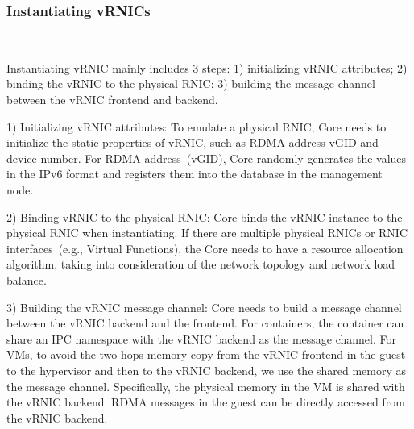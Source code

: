 \subsubsection{\textbf{Instantiating vRNICs}}
\
\noindent


Instantiating vRNIC mainly includes 3 steps: 1) initializing vRNIC attributes; 2) binding the vRNIC to the physical RNIC; 3) building the message channel between the vRNIC frontend and backend.


1) Initializing vRNIC attributes: To emulate a physical RNIC, \sys Core needs to initialize the static properties of vRNIC, such as RDMA address vGID and device number. For RDMA address~(vGID), \sys Core randomly generates the values in the IPv6 format and registers them into the database in the management node.


2) Binding vRNIC to the physical RNIC: \sys Core binds the vRNIC instance to the physical RNIC when instantiating. If there are multiple physical RNICs or RNIC interfaces~(e.g., Virtual Functions), the \sys Core needs to have a resource allocation algorithm, taking into consideration of the network topology and network load balance.


3) Building the vRNIC message channel: \sys Core needs to build a message channel between the vRNIC backend and the frontend.
For containers, the container can share an IPC namespace with the vRNIC backend as the message channel.
For VMs, to avoid the two-hops memory copy from the vRNIC frontend in the guest to the hypervisor and then to the vRNIC backend, we use the shared memory as the message channel. Specifically, the physical memory in the VM is shared with the vRNIC backend. RDMA messages in the guest can be directly accessed from the vRNIC backend.

